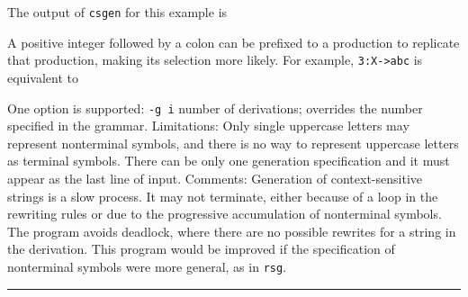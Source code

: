 {The output of \texttt{csgen} for this example is


A positive integer followed by a colon can be prefixed to a production
to replicate that production, making its selection more likely. For
example, \texttt{3:X-{\textgreater}abc} is equivalent to




One option is supported: \texttt{{}-g i} number of derivations;
overrides the number specified in the grammar. Limitations: Only single
uppercase letters may represent nonterminal symbols, and there is no
way to represent uppercase letters as terminal symbols. There can be
only one generation specification and it must appear as the last line
of input. Comments: Generation of context-sensitive strings is a slow
process. It may not terminate, either because of a loop in the
rewriting rules or due to the progressive accumulation of nonterminal
symbols. The program avoids deadlock, where there are no possible
rewrites for a string in the derivation. This program would be improved
if the specification of nonterminal symbols were more general, as in
\texttt{rsg}.

\vspace{0.25cm}\hrule{}}
